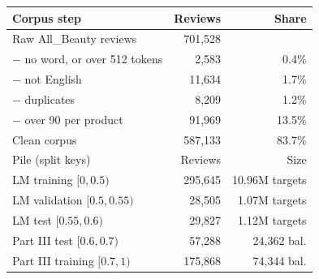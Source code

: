 \begin{tabular}{@{}lrr@{}}
\toprule
Corpus step & Reviews & Share \\
\midrule
Raw All\_Beauty reviews & 701,528 & \\
\quad $-$ no word, or over 512 tokens & 2,583 & 0.4\% \\
\quad $-$ not English & 11,634 & 1.7\% \\
\quad $-$ duplicates & 8,209 & 1.2\% \\
\quad $-$ over 90 per product & 91,969 & 13.5\% \\
Clean corpus & 587,133 & 83.7\% \\
\midrule
Pile (split keys) & Reviews & Size \\
\midrule
LM training $[0, 0.5)$ & 295,645 & 10.96M targets \\
LM validation $[0.5, 0.55)$ & 28,505 & 1.07M targets \\
LM test $[0.55, 0.6)$ & 29,827 & 1.12M targets \\
Part III test $[0.6, 0.7)$ & 57,288 & 24,362 bal. \\
Part III training $[0.7, 1)$ & 175,868 & 74,344 bal. \\
\bottomrule
\end{tabular}
